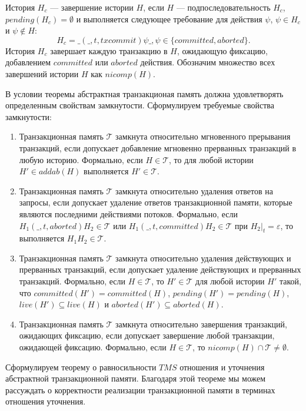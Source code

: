 \begin{mydefinition} История $H_c$ --- завершение истории $H$, если $H$ --- подпоследовательность $H_c$, $pending(H_c) = \emptyset$ и выполняется следующее требование для действия $\psi$, $\psi \in H_c$ и $\psi \notin H$: $$H_c = \_(\_, t, txcommit)\psi\_, \psi \in \{committed, aborted\}.$$
История $H_c$ завершает каждую транзакцию в $H$, ожидающую фиксацию, добавлением $committed$ или $aborted$ действия. Обозначим множество всех завершений истории $H$ как $nicomp(H)$.
\end{mydefinition}

В условии теоремы абстрактная транзакционая память должна удовлетворять определенным свойствам замкнутости. Сформулируем требуемые свойства замкнутости:
\begin{enumerate}
\item Транзакционная память $\mathcal{T}$ замкнута относительно мгновенного прерывания транзакций, если допускает добавление мгновенно прерванных транзакций в любую историю. Формально, если $H \in \mathcal{T}$, то для любой истории $H' \in addab(H)$ выполняется $H' \in \mathcal{T}$. \label{closure:1} 
\item Транзакционная память $\mathcal{T}$ замкнута относительно удаления ответов на запросы, если допускает удаление ответов транзакционной памяти, которые являются последними действиями потоков. Формально, если $H_1(\_, t, aborted)H_2 \in \mathcal{T}$ или $H_1(\_, t, committed)H_2 \in \mathcal{T}$ при $H_2|_t = \varepsilon$, то выполняется $H_1H_2 \in \mathcal{T}$. \label{closure:2}
\item Транзакционная память $\mathcal{T}$ замкнута относительно удаления действующих и прерванных транзакций, если допускает удаление действующих и прерванных транзакций. Формально, если $H \in \mathcal{T}$, то $H' \in \mathcal{T}$ для любой истории $H'$ такой, что $committed(H') = committed(H)$, $pending(H') = pending(H)$, $live(H') \subseteq live(H)$ и $aborted(H') \subseteq aborted(H)$. \label{closure:3}
\item Транзакционная память $\mathcal{T}$ замкнута относительно завершения транзакций, ожидающих фиксацию, если допускает завершение любой транзакции, ожидающей фиксацию. Формально, если $H \in \mathcal{T}$, то $nicomp(H) \cap \mathcal{T} \neq \emptyset$. \label{closure:4}
\end{enumerate}

Сформулируем теорему о равносильности $TMS$ отношения и уточнения абстрактной транзакционной памяти. Благодаря этой теореме мы можем рассуждать о корректности реализации транзакционной памяти в терминах отношения уточнения.

